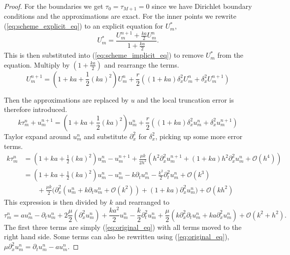\begin{proof}
  For the boundaries we get $\tau_0=\tau_{M+1}= 0$ since we have Dirichlet boundary conditions and the approximations are exact.
  For the inner points we rewrite (\ref{eq:scheme_explicit_eq}) to an explicit equation for $U_m^*$,
  $$
    U_{m}^{*}= \frac{U_{m}^{n+1}+\frac{ka}{2}U_{m}^{n}}{1+\frac{ka}{2}}.$$
    This is then substituted into (\ref{eq:scheme_implicit_eq}) to remove $U_{m}^{*}$ from the equation. 
    Multiply by $(1+\frac{ka}{2})$ and rearrange the terms.
    $$
    U_{m}^{n+1}=\left(1+ ka + \frac{1}{2}(ka)^2\right)U_{m}^{n} + \frac{r}{2}\left((1+ka)\delta_x^2U_{m}^{n} +\delta_x^2U_{m}^{n+1}\right)
    $$

    Then the approximations are replaced by $u$ and the local truncation error is therefore introduced.
    $$
    k\tau_m^n + u_{m}^{n+1} = \left(1+ ka + \frac{1}{2}(ka)^2\right)u_{m}^{n} + \frac{r}{2}\left((1+ka)\delta_x^2u_{m}^{n} +\delta_x^2u_{m}^{n+1}\right)
    $$
    Taylor expand around \( u_m^n \) and substitute
    \( \partial_x^2 \) for \( \delta_x^2 \),
    picking up some more error terms.
    \begin{align*}
      k \tau_m^n &= \left( 1 + ka + \frac{1}{2}(ka)^2\right)u_{m}^{n} - u_{m}^{n+1}+\frac{\mu k}{2h^2} \left(h^2\partial_x^2 u_{m}^{n+1} + \left( 1+ka \right) h^2 \partial_x^2u_{m}^{n} + \mathcal{O}(h^4)\right) \\
      &= \left( 1 + ka + \frac{1}{2}(ka)^2\right)u_{m}^{n} - u_{m}^{n} - k \partial_tu_{m}^{n} - \frac{k^2}{2} \partial_t^2 u_{m}^{n} + \mathcal{O}(k^3)  \\
      &\qquad+ \frac{\mu k}{2} \biggl( \partial_x^2 \left( u_{m}^{n} + k \partial_t u_{m}^{n} + \mathcal{O}(k^2)\right) + \left( 1 + ka\right) \partial_x^2  u_{m}^{n} \biggr) + \mathcal{O}(kh^2)
    \end{align*}
    This expression is then divided by $k$ and rearranged to 
    $$\tau_m^n = a u_{m}^{n} - \partial_tu_{m}^{n} + 2 \frac{\mu}{2}\left( \partial_x^2 u_{m}^{n}\right) +  \frac{ka^2}{2}u_{m}^{n}  - \frac{k}{2} \partial_t^2 u_{m}^{n} + \frac{\mu }{2}\left( k \partial_x^2 \partial_t u_{m}^{n}  + ka \partial_x^2  u_{m}^{n} \right) + \mathcal{O}(k^2 + h^2).$$
    The first three terms are simply (\ref{eq:original_eq}) with all terms moved to the right hand side. Some terms can also be rewritten using (\ref{eq:original_eq}), $\mu \partial_x^2u_{m}^{n} = \partial_t u_{m}^{n} - au_{m}^{n}$.

\end{proof}
